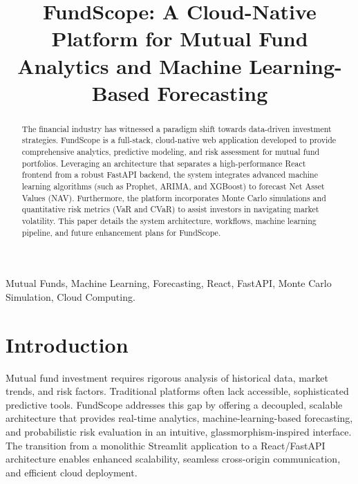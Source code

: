 \documentclass[conference]{IEEEtran}
\begin{document}
\title{FundScope: A Cloud-Native Platform for Mutual Fund Analytics and Machine Learning-Based Forecasting\\}

\author{
}

\maketitle

\begin{abstract}
The financial industry has witnessed a paradigm shift towards data-driven investment strategies. FundScope is a full-stack, cloud-native web application developed to provide comprehensive analytics, predictive modeling, and risk assessment for mutual fund portfolios. Leveraging an architecture that separates a high-performance React frontend from a robust FastAPI backend, the system integrates advanced machine learning algorithms (such as Prophet, ARIMA, and XGBoost) to forecast Net Asset Values (NAV). Furthermore, the platform incorporates Monte Carlo simulations and quantitative risk metrics (VaR and CVaR) to assist investors in navigating market volatility. This paper details the system architecture, workflows, machine learning pipeline, and future enhancement plans for FundScope.
\end{abstract}

\begin{IEEEkeywords}
Mutual Funds, Machine Learning, Forecasting, React, FastAPI, Monte Carlo Simulation, Cloud Computing.
\end{IEEEkeywords}

\section{Introduction}
Mutual fund investment requires rigorous analysis of historical data, market trends, and risk factors. Traditional platforms often lack accessible, sophisticated predictive tools. FundScope addresses this gap by offering a decoupled, scalable architecture that provides real-time analytics, machine-learning-based forecasting, and probabilistic risk evaluation in an intuitive, glassmorphism-inspired interface. The transition from a monolithic Streamlit application to a React/FastAPI architecture enables enhanced scalability, seamless cross-origin communication, and efficient cloud deployment.
\end{document}
